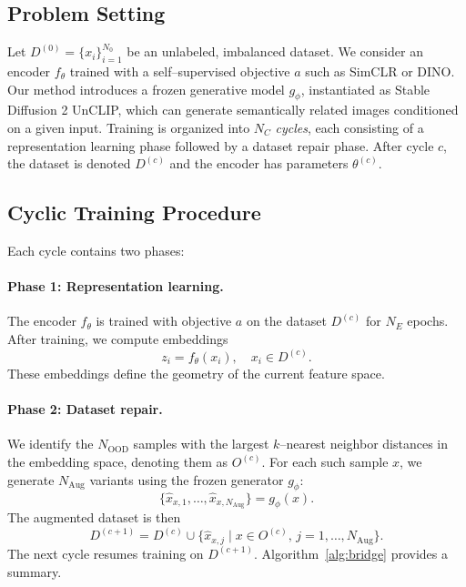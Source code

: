 \documentclass{article} %
\begin{document}
\subsection{Problem Setting}

Let $D^{(0)}=\{x_i\}_{i=1}^{N_0}$ be an unlabeled, imbalanced dataset. We consider an encoder $f_{\theta}$ trained with a self–supervised objective $a$ such as SimCLR or DINO. Our method introduces a frozen generative model $g_{\phi}$, instantiated as Stable Diffusion 2 UnCLIP, which can generate semantically related images conditioned on a given input. Training is organized into $N_C$ \emph{cycles}, each consisting of a representation learning phase followed by a dataset repair phase. After cycle $c$, the dataset is denoted $D^{(c)}$ and the encoder has parameters $\theta^{(c)}$.

\subsection{Cyclic Training Procedure}

Each cycle contains two phases:

\paragraph{Phase 1: Representation learning.}
The encoder $f_{\theta}$ is trained with objective $a$ on the dataset $D^{(c)}$ for $N_E$ epochs. After training, we compute embeddings 
\[
z_i = f_{\theta}(x_i), \quad x_i \in D^{(c)}.
\]
These embeddings define the geometry of the current feature space.

\paragraph{Phase 2: Dataset repair.}
We identify the $N_{\text{OOD}}$ samples with the largest $k$–nearest neighbor distances in the embedding space, denoting them as $O^{(c)}$. For each such sample $x$, we generate $N_{\text{Aug}}$ variants using the frozen generator $g_{\phi}$:
\[
\{\hat{x}_{x,1}, \ldots, \hat{x}_{x,N_{\text{Aug}}}\} = g_{\phi}(x).
\]
The augmented dataset is then
\[
D^{(c+1)} = D^{(c)} \cup \{\hat{x}_{x,j} \mid x \in O^{(c)}, \, j=1,\ldots,N_{\text{Aug}}\}.
\]
The next cycle resumes training on $D^{(c+1)}$. Algorithm~\ref{alg:bridge} provides a summary.
\end{document}
